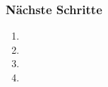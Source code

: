 %
%
%

\begin{frame}
\frametitle{Nächste Schritte}

\begin{enumerate}
\item 
\item 
\item 
\item 
\end{enumerate}

\end{frame}
